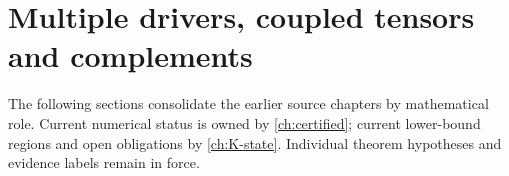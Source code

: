 \chapter{Multiple drivers, coupled tensors and complements}\label{ch:10-coupled-complements}
\noindent The following sections consolidate the earlier source chapters by mathematical role. Current numerical status is owned by \autoref{ch:certified}; current lower-bound regions and open obligations by \autoref{ch:K-state}. Individual theorem hypotheses and evidence labels remain in force.














